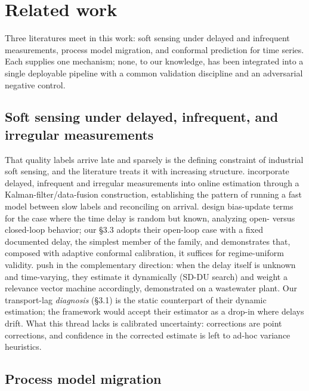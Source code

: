 \section{Related work}
\label{sec:related_work}

Three literatures meet in this work: soft sensing under delayed and infrequent
measurements, process model migration, and conformal prediction for time series. Each
supplies one mechanism; none, to our knowledge, has been integrated into a single
deployable pipeline with a common validation discipline and an adversarial negative control.

\subsection{Soft sensing under delayed, infrequent, and irregular measurements}

That quality labels arrive late and sparsely is the defining constraint of industrial
soft sensing, and the literature treats it with increasing structure. \citep{guo2014} incorporate delayed, infrequent and irregular measurements into online
estimation through a Kalman-filter/data-fusion construction, establishing the pattern
of running a fast model between slow labels and reconciling on arrival. \citep{shardt2016} design bias-update terms for the case where the time delay is random but
known, analyzing open- versus closed-loop behavior; our \S 3.3 adopts their open-loop
case with a fixed documented delay, the simplest member of the family,
and demonstrates that, composed with adaptive conformal calibration, it suffices for
regime-uniform validity. \citep{wang2021dtde} push in the complementary direction:
when the delay itself is unknown and time-varying, they estimate it dynamically
(SD-DU search) and weight a relevance vector machine accordingly, demonstrated on a
wastewater plant. Our transport-lag \emph{diagnosis} (\S 3.1) is the static counterpart of
their dynamic estimation; the framework would accept their estimator as a drop-in
where delays drift. What this thread lacks is calibrated uncertainty: corrections are
point corrections, and confidence in the corrected estimate is left to ad-hoc
variance heuristics.

\subsection{Process model migration}

